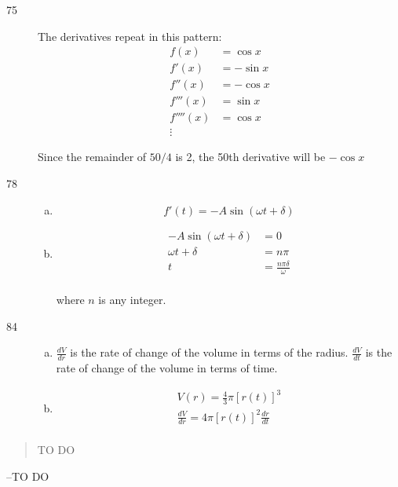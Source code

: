 \documentclass[letterpaper, landscape]{exam}
\begin{document}
\begin{description}
    \item[75]
      The derivatives repeat in this pattern:
      \begin{align*}
        f(x)     & = \cos x \\
        f'(x)    & = -\sin x \\
        f''(x)   & = -\cos x \\
        f'''(x)  & = \sin x \\
        f''''(x) & = \cos x \\
        \vdots
      \end{align*}

      Since the remainder of $50/4$ is 2, the 50th derivative will be $-\cos x$

    \item[78] 
      \begin{enumerate}[(a)]
        \item 
          \[
            f'(t) = -A \sin(\omega t + \delta)
          \]

        \item 
          \begin{align*}
            -A \sin(\omega t + \delta) & = 0 \\
            \omega t + \delta          & = n \pi \\
            t                          & = \boxed{ \frac{n \pi \delta}{\omega} } \\
          \end{align*}

          where $n$ is any integer.

      \end{enumerate}

    \item[84] 
      \begin{enumerate}[(a)]
        \item $\frac{dV}{dr}$ is the rate of change of the volume in terms of the radius.
          $\frac{dV}{dt}$ is the rate of change of the volume in terms of time.


        \item
          \begin{align*}
            V(r) = \frac{4}{3} \pi [r(t)]^3 \\
            \frac{dV}{dr} = 4 \pi [r(t)]^2 \frac{dr}{dt} \\
          \end{align*}
      \end{enumerate}
      
  \end{description}

  \else
    \vspace{10 cm}
    \begin{quote}
      \begin{em}
        TO DO
      \end{em}
    \end{quote}
    \hspace{2 cm} --TO DO
  \fi
\end{document}
